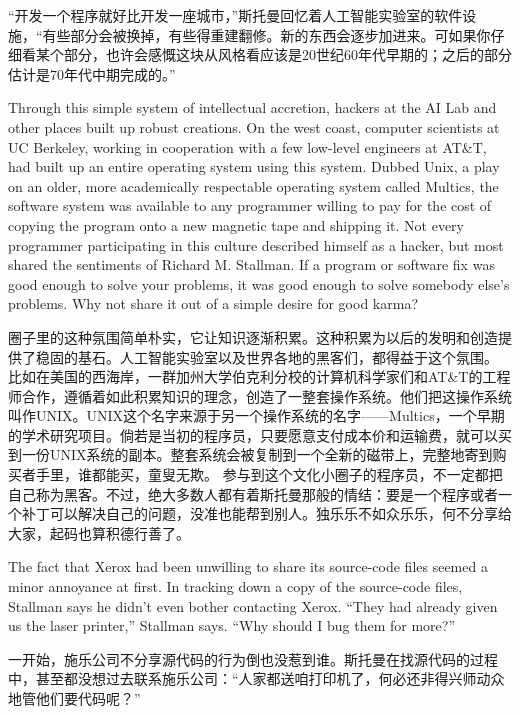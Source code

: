 \ifdefined\chs
``开发一个程序就好比开发一座城市，''斯托曼回忆着人工智能实验室的软件设施，``有些部分会被换掉，有些得重建翻修。新的东西会逐步加进来。可如果你仔细看某个部分，也许会感慨这块从风格看应该是20世纪60年代早期的；之后的部分估计是70年代中期完成的。''
\fi

\ifdefined\eng
Through this simple system of intellectual accretion, hackers at the AI Lab and other places built up robust creations.
\ifdefined\vone
On the west coast, computer scientists at UC Berkeley, working in cooperation with a few low-level engineers at AT\&T, had built up an entire operating system using this system. Dubbed Unix, a play on an older, more academically respectable operating system called Multics, the software system was available to any programmer willing to pay for the cost of copying the program onto a new magnetic tape and shipping it.
\fi
Not every programmer participating in this culture described himself as a hacker, but most shared the sentiments of Richard M. Stallman. If a program or software fix was good enough to solve your problems, it was good enough to solve somebody else's problems. Why not share it out of a simple desire for good karma?
\fi

\ifdefined\chs
圈子里的这种氛围简单朴实，它让知识逐渐积累。这种积累为以后的发明和创造提供了稳固的基石。人工智能实验室以及世界各地的黑客们，都得益于这个氛围。
\ifdefined\vone
比如在美国的西海岸，一群加州大学伯克利分校的计算机科学家们和AT\&T的工程师合作，遵循着如此积累知识的理念，创造了一整套操作系统。他们把这操作系统叫作UNIX。UNIX这个名字来源于另一个操作系统的名字——Multics，一个早期的学术研究项目。倘若是当初的程序员，只要愿意支付成本价和运输费，就可以买到一份UNIX系统的副本。整套系统会被复制到一个全新的磁带上，完整地寄到购买者手里，谁都能买，童叟无欺。
\fi
参与到这个文化小圈子的程序员，不一定都把自己称为黑客。不过，绝大多数人都有着斯托曼那般的情结：要是一个程序或者一个补丁可以解决自己的问题，没准也能帮到别人。独乐乐不如众乐乐，何不分享给大家，起码也算积德行善了。
\fi

\ifdefined\vone
\ifdefined\eng
The fact that Xerox had been unwilling to share its source-code files seemed a
minor annoyance at first. In tracking down a copy of the source-code files,
Stallman says he didn't even bother contacting Xerox. ``They had already given
us the laser printer,'' Stallman says. ``Why should I bug them for more?''
\fi

\ifdefined\chs
一开始，施乐公司不分享源代码的行为倒也没惹到谁。斯托曼在找源代码的过程中，甚至都没想过去联系施乐公司：``人家都送咱打印机了，何必还非得兴师动众地管他们要代码呢？''
\fi

